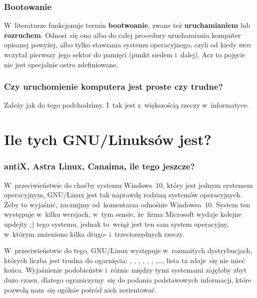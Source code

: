\documentclass[10pt,t]{beamer}
\begin{document}
\begin{frame}
  \frametitle{Bootowanie}


  W~literaturze funkcjonuje termin \textbf{bootwoanie}, zwane też
  \textbf{uruchamianiem} lub \textbf{rozruchem}. Odnosi~się ono albo do
  całej procedury uruchamiania komputer opisanej powyżej, albo tylko
  stawiania systemu operacyjnego, czyli od kiedy \textsc{bios} wczytał
  pierwszy jego sektor do pamięci (punkt siedem i~dalej). Acz to pojęcie
  nie jest specjalnie ostro zdefiniowane.

\end{frame}





\begin{frame}
  \frametitle{Czy uruchomienie komputera jest proste czy trudne?}


  Zależy jak do tego podchodzimy. I~tak jest z~większością rzeczy
  w~informatyce.

\end{frame}





\section{Ile tych GNU/Linuksów jest?}


\begin{frame}
  \frametitle{antiX, Astra Linux, Canaima, ile tego jeszcze?}


  W~przeciwieństwie do choćby systemu Windows~$10$, który jest jednym
  systemem operacyjnym, GNU/Linux jest tak naprawdę \alert{rodziną systemów}
  operacyjnych. Żeby to wyjaśnić, zacznijmy od~komentarza odnośnie
  Windowsa~$10$. System ten występuje w~kilku wersjach, w~tym sensie,
  że~firma Microsoft wydaje kolejne updejty ;) tego systemu, jednak to~wciąż
  jest ten sam system operacyjny, w~którym zmieniono kilka drugo-
  i~trzeciorzędnych rzeczy.

  W~przeciwieństwie do tego, GNU/Linux występuje w~rozmaitych
  \alert{dystrybucjach}, których liczba jest trudna do ogarnięcia:
  ,
  ,
  ,
  ,
  ,
  ,
  ,\ldots, lista ta zdaje~się
  nie mieć końca. Wyjaśnienie podobieństw i~różnic między tymi systemami
  zajęłoby zbyt dużo czasu, dlatego ograniczymy~się do podania
  podstawowych informacji, które pozwolą nam~się ogólnie pośród nich
  zorientować.

\end{frame}
\end{document}
